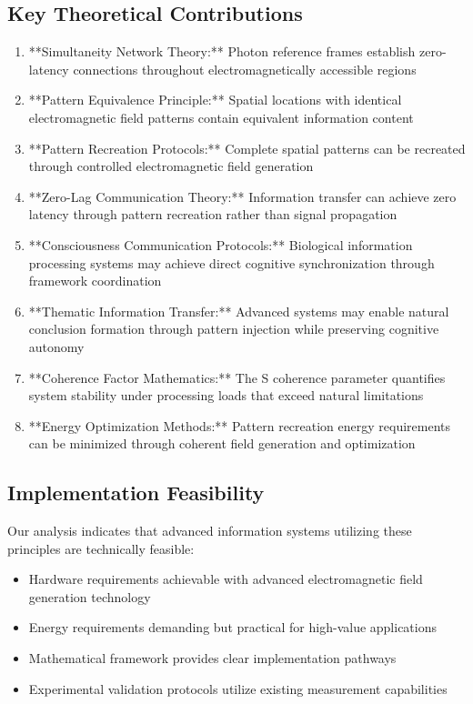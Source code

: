 \documentclass[12pt,a4paper]{article}
\begin{document}
\subsection{Key Theoretical Contributions}

\begin{enumerate}
\item **Simultaneity Network Theory:** Photon reference frames establish zero-latency connections throughout electromagnetically accessible regions
\item **Pattern Equivalence Principle:** Spatial locations with identical electromagnetic field patterns contain equivalent information content
\item **Pattern Recreation Protocols:** Complete spatial patterns can be recreated through controlled electromagnetic field generation
\item **Zero-Lag Communication Theory:** Information transfer can achieve zero latency through pattern recreation rather than signal propagation
\item **Consciousness Communication Protocols:** Biological information processing systems may achieve direct cognitive synchronization through framework coordination
\item **Thematic Information Transfer:** Advanced systems may enable natural conclusion formation through pattern injection while preserving cognitive autonomy
\item **Coherence Factor Mathematics:** The S coherence parameter quantifies system stability under processing loads that exceed natural limitations
\item **Energy Optimization Methods:** Pattern recreation energy requirements can be minimized through coherent field generation and optimization
\end{enumerate}

\subsection{Implementation Feasibility}

Our analysis indicates that advanced information systems utilizing these principles are technically feasible:

\begin{itemize}
\item Hardware requirements achievable with advanced electromagnetic field generation technology
\item Energy requirements demanding but practical for high-value applications
\item Mathematical framework provides clear implementation pathways
\item Experimental validation protocols utilize existing measurement capabilities
\end{itemize}
\end{document}
